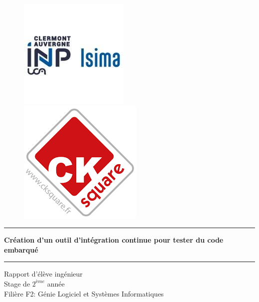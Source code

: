 \begin{titlepage}
  \hspace{\fill}
  \begin{figure}[!htb]
     \begin{minipage}{0.50\textwidth}
       \centering
       \includegraphics[scale=0.8]{./img/logo_isima_inp.jpeg}
     \end{minipage}\hfill
     \begin{minipage}{0.50\textwidth}
       \centering
       \includegraphics[scale=0.4]{./img/logo-ck.png}%
     \end{minipage}
     \label{titelfig:logos}
  \end{figure}
  \begin{center}
    \vspace*{1cm}

    \par\noindent\rule{\textwidth}{0.5pt}
    \Huge
    \textbf{Création d'un outil d'intégration continue pour tester du code embarqué}
    \par\noindent\rule{\textwidth}{0.5pt}

    \vspace{0.2cm}
    \LARGE
    Rapport d'élève ingénieur\\
    Stage de $2^{ème}$ année\\
    Filière F2: Génie Logiciel et Systèmes Informatiques

    \vspace{1.5cm}


\end{center}
\end{titlepage}

